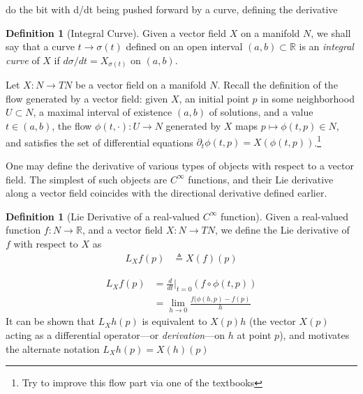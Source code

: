 \documentclass[psamsfonts]{amsart}
\theoremstyle{definition}
\newtheorem{defn}[thm]{Definition}
\theoremstyle{remark}
\newcommand*\R{\mathds{R}}
\numberwithin{equation}{section}
\begin{document}
{\color{red}do the bit with d/dt being pushed forward by a curve, defining the derivative

\begin{defn}[Integral Curve]
Given a vector field $X$ on a manifold $N$, we shall say that a curve $t\rightarrow \sigma (t)$ defined on an open interval $(a,b)\subset \R$ is an \textit{integral curve} of $X$ if $d \sigma / dt = X_{\sigma (t)}$ on $(a, b)$. %
\end{defn}





Let $X: N \rightarrow TN$ be a vector field on a manifold $N$. Recall the definition of the flow
generated by a vector field: given $X$, an initial point $p$ in some neighborhood $U\subset N$, a maximal interval of existence $(a, b)$ of solutions, and a value $t\in (a,b)$, the flow $\phi(t, \cdot): U \rightarrow N$ generated by $X$ maps $p \mapsto \phi(t, p)\in N$, and satisfies the set of differential equations $\partial_t\phi(t, p) = X(\phi(t, p))$.\footnote{{\color{red} Try to improve this flow part via one of the textbooks}}

One may define the derivative of various types of objects with respect to a vector field. The simplest of such objects are $C^{\infty}$ functions, and their Lie derivative along a vector field coincides with the directional derivative defined earlier. 

\begin{defn}[Lie Derivative of a real-valued $C^{\infty}$ function]
Given a real-valued function $f: N \rightarrow \R$, and a vector field $X: N\rightarrow TN$, we define the Lie derivative of $f$ with respect to $X$ as
\begin{align}
L_Xf(p) &\triangleq {} X(f)(p) 
\end{align}
\end{defn}

\begin{equation}
\begin{aligned}
L_Xf(p) &={}\frac{d}{dt}\biggr|_{t=0}\left( f \circ \phi(t, p)  \right)\\
&={} \lim_{h\rightarrow 0}\frac{f(\phi(h, p)-f(p)}{h}
\end{aligned}
\end{equation}
It can be shown that $L_Xh(p)$ is equivalent to $X(p)h$ (the vector $X(p)$ acting as a differential operator---or \textit{derivation}---on $h$ at point $p$), and motivates the alternate notation $L_Xh(p) = X(h)(p)$

}
\end{document}
